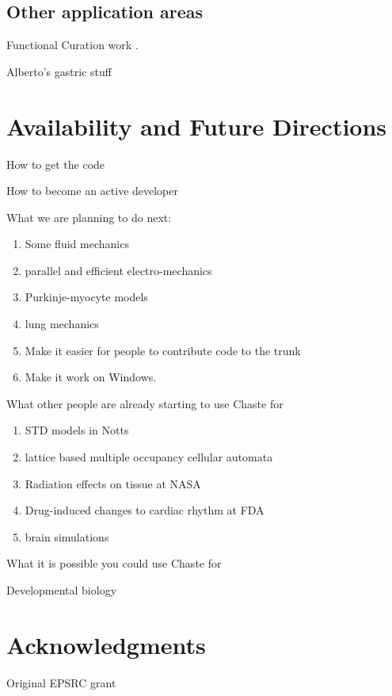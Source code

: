 \documentclass[10pt]{article}
\begin{document}
\subsection*{Other application areas}

Functional Curation work \cite{Cooper2011}.

Alberto's gastric stuff

\section*{Availability and Future Directions}

How to get the code

How to become an active developer

What we are planning to do next:
\begin{enumerate}
    \item Some fluid mechanics
    \item parallel and efficient electro-mechanics \cite{Pathmanathan2010}
    \item Purkinje-myocyte models
    \item lung mechanics
    \item Make it easier for people to contribute code to the trunk
    \item Make it work on Windows.
\end{enumerate}

What other people are already starting to use Chaste for
\begin{enumerate}
    \item STD models in Notts
    \item lattice based multiple occupancy cellular automata
    \item Radiation effects on tissue at NASA
    \item Drug-induced changes to cardiac rhythm at FDA
    \item brain simulations
\end{enumerate}

What it is possible you could use Chaste for

Developmental biology


\section*{Acknowledgments}

Original EPSRC grant
\end{document}
